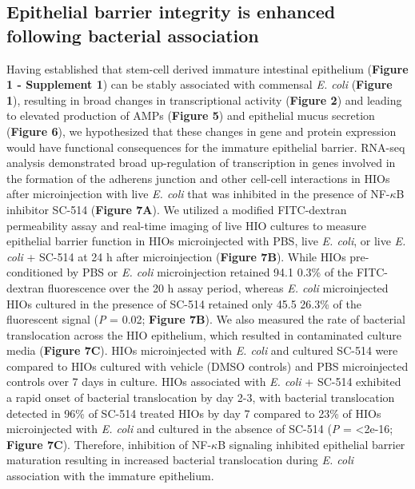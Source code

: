 \documentclass[9pt,lineo]{elife}
\begin{document}
\subsection*{{\bfseries\sffamily } Epithelial barrier integrity is enhanced following bacterial association}
\label{sec:orgheadline9}
Having established that stem-cell derived immature intestinal epithelium (\textbf{Figure 1 - Supplement 1}) can be stably associated with commensal \emph{E. coli} (\textbf{Figure 1}), resulting in broad changes in transcriptional activity (\textbf{Figure 2}) and leading to elevated production of AMPs (\textbf{Figure 5}) and epithelial mucus secretion (\textbf{Figure 6}), we hypothesized that these changes in gene and protein expression would have functional consequences for the immature epithelial barrier. RNA-seq analysis demonstrated broad up-regulation of transcription in genes involved in the formation of the adherens junction and other cell-cell interactions in HIOs after microinjection with live \emph{E. coli} that was inhibited in the presence of NF-\(\kappa\)B inhibitor SC-514 (\textbf{Figure 7A}). We utilized a modified FITC-dextran permeability assay \citep{Leslie:2015} and real-time imaging of live HIO cultures to measure epithelial barrier function in HIOs microinjected with PBS, live \emph{E. coli}, or live \emph{E. coli} + SC-514 at 24 h after microinjection (\textbf{Figure 7B}). While HIOs pre-conditioned by PBS or \emph{E. coli} microinjection retained 94.1 \textpm{} 0.3\% of the FITC-dextran fluorescence over the 20 h assay period, whereas \emph{E. coli} microinjected HIOs cultured in the presence of SC-514 retained only 45.5 \textpm{} 26.3\% of the fluorescent signal (\emph{P} = 0.02; \textbf{Figure 7B}). We also measured the rate of bacterial translocation across the HIO epithelium, which resulted in contaminated culture media (\textbf{Figure 7C}). HIOs microinjected with \emph{E. coli} and cultured \textpm{} SC-514 were compared to HIOs cultured with vehicle (DMSO controls) and PBS microinjected controls over 7 days in culture. HIOs associated with \emph{E. coli} + SC-514 exhibited a rapid onset of bacterial translocation by day 2-3, with bacterial translocation detected in 96\% of SC-514 treated HIOs by day 7 compared to 23\% of HIOs microinjected with \emph{E. coli} and cultured in the absence of SC-514 (\emph{P} = \num{<2e-16}; \textbf{Figure 7C}). Therefore, inhibition of NF-\(\kappa\)B signaling inhibited epithelial barrier maturation resulting in increased bacterial translocation during \emph{E. coli} association with the immature epithelium.
\end{document}

